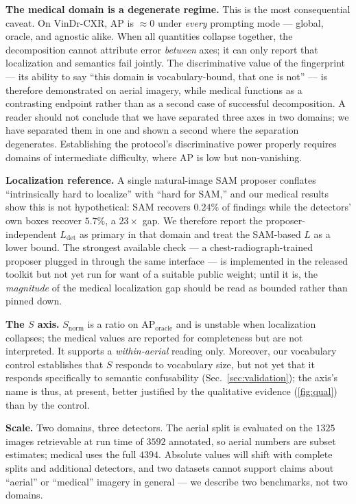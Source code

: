 \documentclass[10pt,twocolumn,letterpaper]{article}
\providecommand{\Cref}[1]{\ref{#1}}
\begin{document}
\textbf{The medical domain is a degenerate regime.} This is the most consequential caveat.
On VinDr-CXR, AP is ${\approx}0$ under \emph{every} prompting mode --- global, oracle, and
agnostic alike. When all quantities collapse together, the decomposition cannot attribute
error \emph{between} axes; it can only report that localization and semantics fail jointly.
The discriminative value of the fingerprint --- its ability to say ``this domain is
vocabulary-bound, that one is not'' --- is therefore demonstrated on aerial imagery, while
medical functions as a contrasting endpoint rather than as a second case of successful
decomposition. A reader should not conclude that we have separated three axes in two
domains; we have separated them in one and shown a second where the separation degenerates.
Establishing the protocol's discriminative power properly requires domains of intermediate
difficulty, where AP is low but non-vanishing.

\textbf{Localization reference.} A single natural-image SAM proposer conflates
``intrinsically hard to localize'' with ``hard for SAM,'' and our medical results show this
is not hypothetical: SAM recovers $0.24\%$ of findings while the detectors' own boxes
recover $5.7\%$, a $23{\times}$ gap. We therefore report the proposer-independent
$L_{\mathrm{det}}$ as primary in that domain and treat the SAM-based $L$ as a lower bound.
The strongest available check --- a chest-radiograph-trained proposer plugged in through the
same interface --- is implemented in the released toolkit but not yet run for want of a
suitable public weight; until it is, the \emph{magnitude} of the medical localization gap
should be read as bounded rather than pinned down.

\textbf{The $S$ axis.} $S_{\mathrm{norm}}$ is a ratio on $\mathrm{AP}_{\mathrm{oracle}}$ and
is unstable when localization collapses; the medical values are reported for completeness
but are not interpreted. It supports a \emph{within-aerial} reading only. Moreover, our
vocabulary control establishes that $S$ responds to vocabulary size, but not yet that it
responds specifically to semantic confusability (Sec.~\ref{sec:validation}); the axis's
name is thus, at present, better justified by the qualitative evidence
(\Cref{fig:qual}) than by the control.

\textbf{Scale.} Two domains, three detectors. The aerial split is evaluated on the $1325$
images retrievable at run time of $3592$ annotated, so aerial numbers are subset estimates;
medical uses the full $4394$. Absolute values will shift with complete splits and additional
detectors, and two datasets cannot support claims about ``aerial'' or ``medical'' imagery in
general --- we describe two benchmarks, not two domains.
\end{document}
